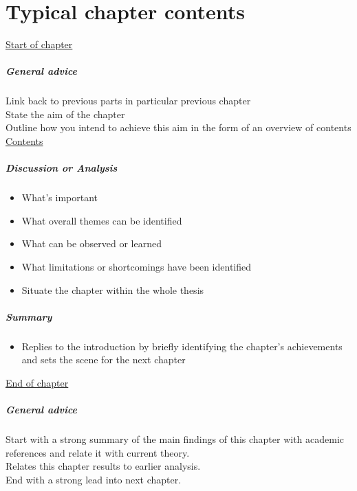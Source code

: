 \documentclass[dissertation,final]{softeng}
\begin{document}
\chapter{Typical chapter contents}


\underline{Start of chapter}
\paragraph{General advice}
Link back to previous parts in particular previous chapter\\
State the aim of the chapter\\
Outline how you intend to achieve this aim in the form of an overview of contents\\

\noindent\underline{Contents}
\paragraph{Discussion or Analysis}
\begin{itemize}
\item What's important
\item What overall themes can be identified
\item What can be observed or learned
\item What limitations or shortcomings have been identified
\item Situate the chapter within the whole thesis
\end{itemize}
\paragraph{Summary}
\begin{itemize}
\item Replies to the introduction by briefly identifying the chapter's achievements and sets the scene for the next chapter
\end{itemize}

\noindent\underline{End of chapter}
\paragraph{General advice}
Start with a strong summary of the main findings of this chapter with academic references and relate it with current theory.\\
Relates this chapter results to earlier analysis.\\
End with a strong lead into next chapter.\\
\end{document}
